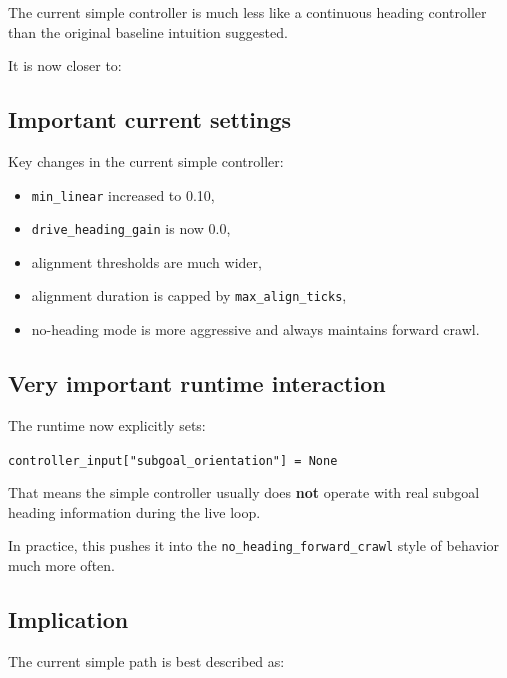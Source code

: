 \documentclass[11pt,a4paper]{article}
\begin{document}
The current simple controller is much less like a continuous heading controller
than the original baseline intuition suggested.

It is now closer to:

\begin{center}
\end{center}

\subsection{Important current settings}

Key changes in the current simple controller:

\begin{itemize}[nosep]
  \item \texttt{min\_linear} increased to 0.10,
  \item \texttt{drive\_heading\_gain} is now 0.0,
  \item alignment thresholds are much wider,
  \item alignment duration is capped by \texttt{max\_align\_ticks},
  \item no-heading mode is more aggressive and always maintains forward crawl.
\end{itemize}

\subsection{Very important runtime interaction}

The runtime now explicitly sets:

\begin{center}
\texttt{controller\_input["subgoal\_orientation"] = None}
\end{center}

That means the simple controller usually does \textbf{not} operate with real
subgoal heading information during the live loop.

In practice, this pushes it into the \texttt{no\_heading\_forward\_crawl} style
of behavior much more often.

\subsection{Implication}

The current simple path is best described as:
\end{document}

